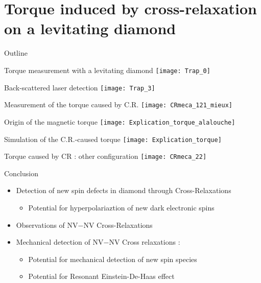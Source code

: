 \documentclass{beamer}
\begin{document}
\section{Torque induced by cross-relaxation on a levitating diamond}
\begin{frame}{Outline}
\tableofcontents[currentsection]
\end{frame}
\begin{frame}{Torque measurement with a levitating diamond}
\centering
\texttt{[image: Trap\_0]}%
\end{frame}
\begin{frame}{Back-scattered laser detection}
\centering
\texttt{[image: Trap\_3]}%
\end{frame}
\begin{frame}{Measurement of the torque caused by C.R.}
\centering
\texttt{[image: CRmeca\_121\_mieux]}
\end{frame}
\begin{frame}{Origin of the magnetic torque}
\centering
\texttt{[image: Explication\_torque\_alalouche]}
\end{frame}
\begin{frame}{Simulation of the C.R.-caused torque}
\centering
\texttt{[image: Explication\_torque]}
\end{frame}
\begin{frame}{Torque caused by CR : other configuration}
\centering
\texttt{[image: CRmeca\_22]}
\end{frame}
\begin{frame}{Conclusion}
\begin{itemize}
\setlength\itemsep{1em}
\item{Detection of new spin defects in diamond through Cross-Relaxations
\begin{itemize}
\item Potential for hyperpolariaztion of new dark electronic spins
\end{itemize}}
\item{Observations of NV$-$NV Cross-Relaxations}
\item{Mechanical detection of NV$-$NV Cross relaxations :
\begin{itemize}
\item Potential for mechanical detection of new spin species
\item Potential for Resonant Einstein-De-Haas effect 
\end{itemize} }
\end{itemize}
\end{frame}
\end{document}
